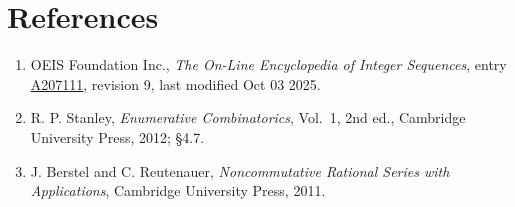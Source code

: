 \documentclass[11pt]{article}
\theoremstyle{definition}
\begin{document}
\section{References}

\begin{enumerate}

\item OEIS Foundation Inc., \emph{The On-Line Encyclopedia of Integer Sequences}, entry \href{https://oeis.org/A207111}{A207111}, revision 9, last modified Oct 03 2025.

\item R. P. Stanley, \emph{Enumerative Combinatorics}, Vol.~1, 2nd ed., Cambridge University Press, 2012; \S4.7.

\item J. Berstel and C. Reutenauer, \emph{Noncommutative Rational Series with Applications}, Cambridge University Press, 2011.

\end{enumerate}
\end{document}

